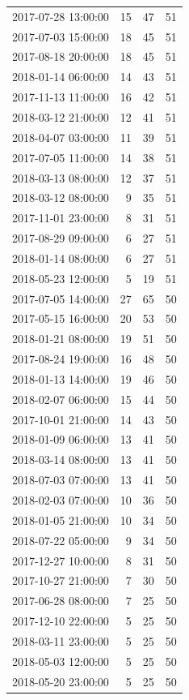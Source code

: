 \begin{tabular}{lrrr}
2017-07-28 13:00:00 & 15 & 47 & 51 \\
2017-07-03 15:00:00 & 18 & 45 & 51 \\
2017-08-18 20:00:00 & 18 & 45 & 51 \\
2018-01-14 06:00:00 & 14 & 43 & 51 \\
2017-11-13 11:00:00 & 16 & 42 & 51 \\
2018-03-12 21:00:00 & 12 & 41 & 51 \\
2018-04-07 03:00:00 & 11 & 39 & 51 \\
2017-07-05 11:00:00 & 14 & 38 & 51 \\
2018-03-13 08:00:00 & 12 & 37 & 51 \\
2018-03-12 08:00:00 & 9 & 35 & 51 \\
2017-11-01 23:00:00 & 8 & 31 & 51 \\
2017-08-29 09:00:00 & 6 & 27 & 51 \\
2018-01-14 08:00:00 & 6 & 27 & 51 \\
2018-05-23 12:00:00 & 5 & 19 & 51 \\
2017-07-05 14:00:00 & 27 & 65 & 50 \\
2017-05-15 16:00:00 & 20 & 53 & 50 \\
2018-01-21 08:00:00 & 19 & 51 & 50 \\
2017-08-24 19:00:00 & 16 & 48 & 50 \\
2018-01-13 14:00:00 & 19 & 46 & 50 \\
2018-02-07 06:00:00 & 15 & 44 & 50 \\
2017-10-01 21:00:00 & 14 & 43 & 50 \\
2018-01-09 06:00:00 & 13 & 41 & 50 \\
2018-03-14 08:00:00 & 13 & 41 & 50 \\
2018-07-03 07:00:00 & 13 & 41 & 50 \\
2018-02-03 07:00:00 & 10 & 36 & 50 \\
2018-01-05 21:00:00 & 10 & 34 & 50 \\
2018-07-22 05:00:00 & 9 & 34 & 50 \\
2017-12-27 10:00:00 & 8 & 31 & 50 \\
2017-10-27 21:00:00 & 7 & 30 & 50 \\
2017-06-28 08:00:00 & 7 & 25 & 50 \\
2017-12-10 22:00:00 & 5 & 25 & 50 \\
2018-03-11 23:00:00 & 5 & 25 & 50 \\
2018-05-03 12:00:00 & 5 & 25 & 50 \\
2018-05-20 23:00:00 & 5 & 25 & 50 \\

\end{tabular}
